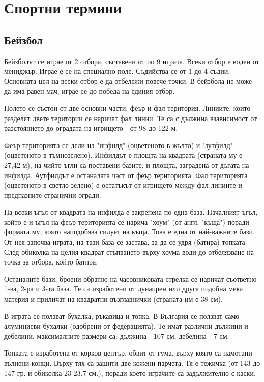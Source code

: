 \chapter{Спортни термини}
\section{Бейзбол}
Бейзболът се играе от 2 отбора, съставени от по 9 играча. Всеки отбор е воден от мениджър. Играе е се на специално поле. Съдийства се от 1 до 4 съдии. Основната цел на всеки отбор е да отбележи повече точки. В бейзбола не може да има равен мач, играе се до победа на единия отбор.

Полето се състои от две основни части: феър и фал територия. Линиите, които разделят двете територии се наричат фал линии. Те са с дължина взависимост от разстоянието до оградата на игрището - от 98 до 122 м.

Феър територията се дели на "инфилд" (оцветеното в жълто) и "аутфилд" (оцветеното в тъмнозелено). Инфилдът е площта на квадрата (страната му е 27,42 м), на чийто ъгли са поставени базите, и площта, заградена от дъгата на инфилда. Аутфилдът е останалата част от феър територията. Фал територията (оцветеното в светло зелено) е остатъкът от игрището между фал линиите и предпазните странични огради.

На всеки ъгъл от квадрата на инфилда е закрепена по една база. Началният ъгъл, който е и ъгъл на феър територията се нарича "хоум" (от англ. "къща") поради формата му, която наподобява силует на къща. Това е една от най-важните бази. От нея започва играта, на тази база се застава, за да се удря (батира) топката. След обиколка на целия квадрат стъпването върху хоума води до отбелязване на точка за отбора, който батира.

Останалите бази, броени обратно на часовниковата стрелка се наричат съответно 1-ва, 2-ра и 3-та база. Те са изработени от дунапрен или друга подобна мека материя и приличат на квадратни възглавнички (страната им е 38 см).

В играта се ползват бухалка, ръкавица и топка. В България се ползват само алуминиеви бухалки (одобрени от федерацията). Те имат различни дължини и дебелини, максималните размери са: дължина - 107 см, дебелина - 7 см.

Топката е изработена от корков център, обвит от гума, върху която са намотани вълнени конци. Върху тях са зашити две кожени парчета. Тя е тежичка (от 143 до 147 гр. и обиколка 23-23,7 см.), поради което играчите са задължително с каски.

